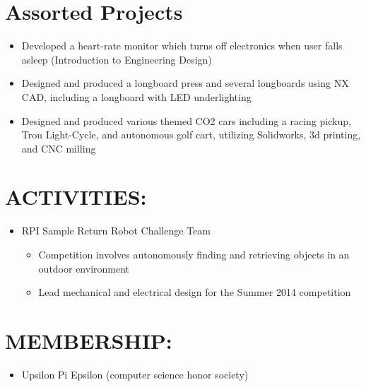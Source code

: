 \documentclass[margin]{res}
\begin{document}
\begin{resume}
\normalsize{\section{Assorted Projects}}
\begin{itemize}
  \item Developed a heart-rate monitor which turns off electronics when user
    falls asleep (Introduction to Engineering Design)
  \item Designed and produced a longboard press and several longboards using NX CAD, including a longboard
        with LED underlighting
  \item Designed and produced various themed CO2 cars including a racing pickup, Tron Light-Cycle,
        and autonomous golf cart, utilizing Solidworks, 3d printing, and CNC milling
\end{itemize}
\section{ACTIVITIES:}
	\begin{itemize}
    \item RPI Sample Return Robot Challenge Team
    \begin{itemize}
      \item Competition involves autonomously finding and retrieving objects in an outdoor environment
      \item Lead mechanical and electrical design for the Summer 2014 competition
    \end{itemize}
	\end{itemize}
\section{MEMBERSHIP:}
	\begin{itemize}
    \item Upsilon Pi Epsilon (computer science honor society)
	\end{itemize}
\end{resume} 
\end{document}
